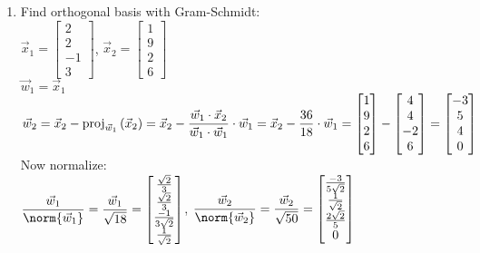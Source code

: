 \documentclass[leqno]{article}
\begin{document}
\begin{enumerate}
\begin{enumerate}
\begin{enumerate}
            \item Find orthogonal basis with Gram-Schmidt:\\
            $\Vec x_1 = \begin{bmatrix}2 \\ 2 \\ -1 \\ 3\end{bmatrix}$, $\Vec x_2 = \begin{bmatrix}1 \\ 9 \\ 2 \\ 6\end{bmatrix}$\\
            $\Vec w_1 = \Vec x_1$\\
            $\displaystyle \Vec w_2 = \Vec x_2 - \mathrm{proj}_{\Vec w_1}\left(\Vec x_2\right) = \Vec x_2 - \frac{\Vec w_1 \cdot \Vec x_2}{\Vec w_1 \cdot \Vec w_1} \cdot \Vec w_1 = \Vec x_2 - \frac{36}{18} \cdot \Vec w_1 = \begin{bmatrix}1 \\ 9 \\ 2 \\ 6\end{bmatrix} - \begin{bmatrix}4 \\ 4 \\ -2 \\ 6\end{bmatrix} = \begin{bmatrix}-3 \\ 5 \\ 4 \\ 0\end{bmatrix}$\\
            Now normalize:\\
            $\displaystyle \frac{\Vec w_1}{\norm{\Vec w_1}} = \frac{\Vec w_1}{\sqrt{18}} = \begin{bmatrix}\frac{\sqrt{2}}{3} \\ \frac{\sqrt{2}}{3} \\ \frac{-1}{3\sqrt{2}} \\ \frac{1}{\sqrt 2}\end{bmatrix}$, $\displaystyle \frac{\Vec w_2}{\norm{\Vec w_2}} = \frac{\Vec w_2}{\sqrt{50}} = \begin{bmatrix}\frac{-3}{5\sqrt 2} \\ \frac{1}{\sqrt 2} \\ \frac{2\sqrt 2}{5} \\ 0\end{bmatrix}$\\

\end{enumerate}
\end{enumerate}
\end{enumerate}
\end{document}
